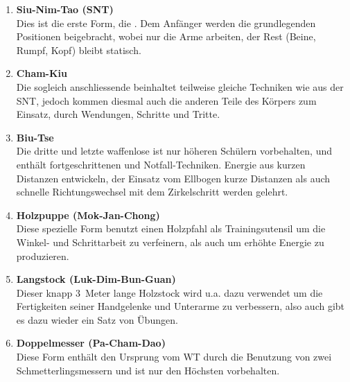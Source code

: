 \begin{enumerate}
	\item \textbf{Siu-Nim-Tao (SNT)} \\ Dies ist die erste Form, die . Dem Anf\"anger werden die grundlegenden Positionen beigebracht, wobei nur die Arme arbeiten, der Rest (Beine, Rumpf, Kopf) bleibt statisch.
	\item \textbf{Cham-Kiu} \\ Die sogleich anschliessende  beinhaltet teilweise gleiche Techniken wie aus der SNT, jedoch kommen diesmal auch die anderen Teile des K\"orpers zum Einsatz, durch Wendungen, Schritte und Tritte.
	\item \textbf{Biu-Tse} \\ Die dritte und letzte waffenlose  ist nur h\"oheren Sch\"ulern vorbehalten, und enth\"alt fortgeschrittenen und Notfall-Techniken. Energie aus kurzen Distanzen entwickeln, der Einsatz vom Ellbogen kurze Distanzen als auch schnelle Richtungswechsel mit dem Zirkelschritt werden gelehrt.
	\item \textbf{Holzpuppe (Mok-Jan-Chong)} \\ Diese spezielle Form benutzt einen Holzpfahl als Trainingsutensil um die Winkel- und Schrittarbeit zu verfeinern, als auch um erh\"ohte Energie zu produzieren. %
	\item \textbf{Langstock (Luk-Dim-Bun-Guan)} \\ Dieser knapp 3~Meter lange Holzstock wird u.a. dazu verwendet um die Fertigkeiten seiner Handgelenke und Unterarme zu verbessern, also auch gibt es dazu wieder ein Satz von \"Ubungen.
	\item \textbf{Doppelmesser (Pa-Cham-Dao)} \\ Diese Form enth\"alt den Ursprung vom WT durch die Benutzung von zwei Schmetterlingsmessern und ist nur den H\"ochsten vorbehalten.
\end{enumerate}

